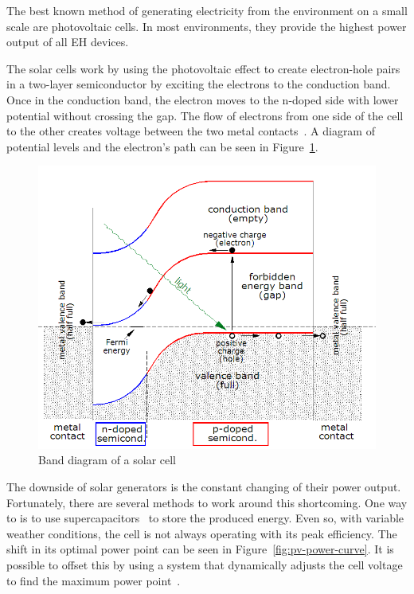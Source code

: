 \documentclass[a4paper,10pt]{article}
\begin{document}
The best known method of generating electricity from the environment on a small scale are photovoltaic cells. In most environments, they provide the highest power output of all \ac{EH} devices. 

The solar cells work by using the photovoltaic effect to create electron-hole pairs in a two-layer semiconductor by exciting the electrons to the conduction band. Once in the conduction band, the electron moves to the n-doped side with lower potential without crossing the gap. The flow of electrons from one side of the cell to the other creates voltage between the two metal contacts~\cite{wiki:solar-cells}. A diagram of potential levels and the electron's path can be seen in Figure~\ref{fig:pv-band-diagram}. 

\begin{figure}
\includegraphics[width=\textwidth]{./Slike/PV-band-diagram}
 \caption{Band diagram of a solar cell~\cite{wiki:solar-cells}}
\label{fig:pv-band-diagram}
\end{figure}

The downside of solar generators is the constant changing of their power output. Fortunately, there are several methods to work around this shortcoming. One way to is to use supercapacitors~\cite{cap-wsn-ieee} to store the produced energy. Even so, with variable weather conditions, the cell is not always operating with its peak efficiency. The shift in its optimal power point can be seen in Figure~\ref{fig:pv-power-curve}. It is possible to offset this by using a system that dynamically adjusts the cell voltage to find the maximum power point~\cite{solar-mppt-ieee}. 
\end{document}
